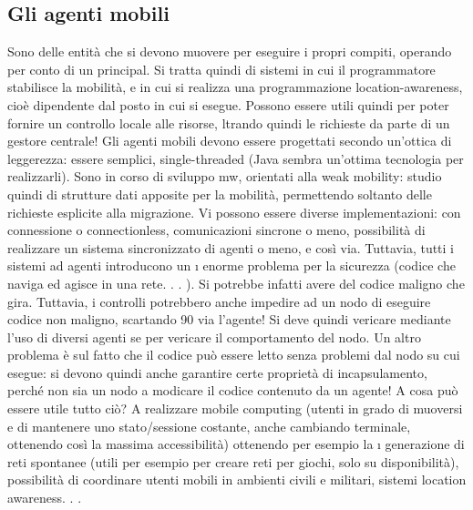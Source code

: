 \subsection{Gli agenti mobili}
Sono delle entità che si devono muovere per eseguire i propri compiti, operando
per conto di un principal. Si tratta quindi di sistemi in cui il programmatore stabilisce la mobilità, e in cui si
realizza una programmazione location-awareness,
cioè dipendente dal posto in cui si esegue. Possono essere utili quindi per poter
fornire un controllo locale alle risorse, ltrando quindi le richieste da parte di un
gestore centrale! Gli agenti mobili devono essere progettati secondo un'ottica di
leggerezza: essere semplici, single-threaded (Java sembra un'ottima tecnologia
per realizzarli). Sono in corso di sviluppo mw, orientati alla weak mobility:
studio quindi di strutture dati apposite per la mobilità, permettendo soltanto
delle richieste esplicite alla migrazione.
Vi possono essere diverse implementazioni: con connessione o connectionless,
comunicazioni sincrone o meno, possibilità di realizzare un sistema sincronizzato
di agenti o meno, e così via. Tuttavia, tutti i sistemi ad agenti introducono un
\i{}
enorme problema per la sicurezza (codice che naviga ed agisce in una rete. . . ). Si
potrebbe infatti avere del codice maligno che gira. Tuttavia, i controlli potrebbero anche impedire ad un nodo di
eseguire codice non maligno, scartando
90
via l'agente! Si deve quindi vericare mediante l'uso di diversi agenti se per
vericare il comportamento del nodo.
Un altro problema è sul fatto che il codice può essere letto senza problemi
dal nodo su cui esegue: si devono quindi anche garantire certe proprietà di
incapsulamento, perché non sia un nodo a modicare il codice contenuto da un
agente!
A cosa può essere utile tutto ciò? A realizzare mobile computing (utenti in
grado di muoversi e di mantenere uno stato/sessione costante, anche cambiando
terminale, ottenendo così la massima accessibilità) ottenendo per esempio la
\i{}
generazione di reti spontanee (utili per esempio per creare reti per giochi, solo su
disponibilità), possibilità di coordinare utenti mobili in ambienti civili e militari,
sistemi location awareness. . .